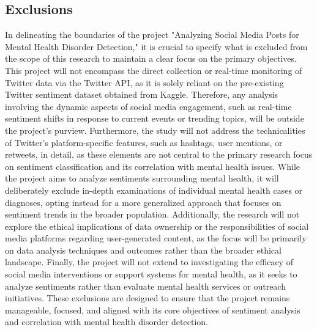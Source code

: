 \subsection{Exclusions}
\noindent
In delineating the boundaries of the project "Analyzing Social Media Posts for Mental Health Disorder Detection," it is crucial to specify what is excluded from the scope of this research to maintain a clear focus on the primary objectives. This project will not encompass the direct collection or real-time monitoring of Twitter data via the Twitter API, as it is solely reliant on the pre-existing Twitter sentiment dataset obtained from Kaggle. Therefore, any analysis involving the dynamic aspects of social media engagement, such as real-time sentiment shifts in response to current events or trending topics, will be outside the project's purview. Furthermore, the study will not address the technicalities of Twitter’s platform-specific features, such as hashtags, user mentions, or retweets, in detail, as these elements are not central to the primary research focus on sentiment classification and its correlation with mental health issues. While the project aims to analyze sentiments surrounding mental health, it will deliberately exclude in-depth examinations of individual mental health cases or diagnoses, opting instead for a more generalized approach that focuses on sentiment trends in the broader population. Additionally, the research will not explore the ethical implications of data ownership or the responsibilities of social media platforms regarding user-generated content, as the focus will be primarily on data analysis techniques and outcomes rather than the broader ethical landscape. Finally, the project will not extend to investigating the efficacy of social media interventions or support systems for mental health, as it seeks to analyze sentiments rather than evaluate mental health services or outreach initiatives. These exclusions are designed to ensure that the project remains manageable, focused, and aligned with its core objectives of sentiment analysis and correlation with mental health disorder detection.

